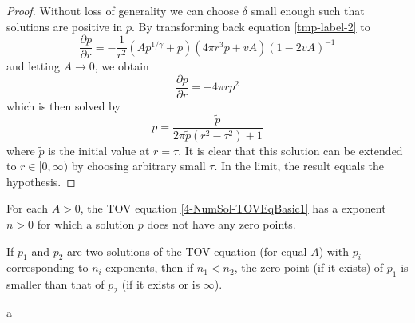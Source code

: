 \begin{proof}
	Without loss of generality we can choose $\delta$ small enough such that solutions are positive in $p$.
	By transforming back equation \ref{tmp-label-2} to 
	\begin{equation}
		\frac{\partial p}{\partial r} = -\frac{1}{r^2}\left(Ap^{1/\gamma}+p\right)\left(4\pi r^3p+vA\right)\left(1-2vA\right)^{-1}
	\end{equation}
	and letting $A\rightarrow0$, we obtain
	\begin{equation}
		\frac{\partial p}{\partial r} = - 4\pi rp^2
	\end{equation}
	which is then solved by
	\begin{equation}
		p = \frac{\tilde{p}}{2\pi\tilde{p}(r^2-\tau^2)+1}
	\end{equation}
	where $\tilde{p}$ is the initial value at $r=\tau$. It is clear that this solution can be extended to $r\in[0,\infty)$ by choosing arbitrary small $\tau$.
	In the limit, the result equals the hypothesis.
\end{proof}
\begin{theorem}
	For each $A>0$, the TOV equation \ref{4-NumSol-TOVEqBasic1} has a exponent $n>0$ for which a solution $p$ does not have any zero points.
\end{theorem}
\begin{theorem}
	If $p_1$ and $p_2$ are two solutions of the TOV equation (for equal $A$) with $p_i$ corresponding to $n_i$ exponents, then if $n_1<n_2$, the zero 
	point (if it exists) of $p_1$ is smaller than that of $p_2$ (if it exists or is $\infty$).
\end{theorem}
\begin{theorem}
	a 
\end{theorem}




